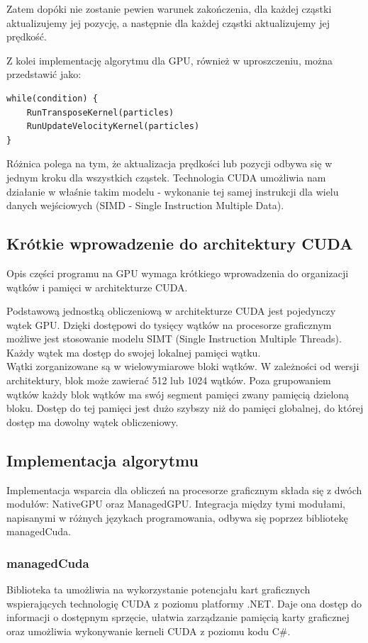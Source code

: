 \documentclass[12pt, twoside, openany, abstract=on]{report}
\theoremstyle{definition}
\begin{document}
Zatem dopóki nie zostanie pewien warunek zakończenia, dla każdej cząstki aktualizujemy jej pozycję, a następnie dla każdej cząstki aktualizujemy jej prędkość.

Z kolei implementację algorytmu dla GPU, również w uproszczeniu, można przedstawić jako:

\begin{lstlisting}[frame=single]
while(condition) {
	RunTransposeKernel(particles)
	RunUpdateVelocityKernel(particles)
}
\end{lstlisting}

Różnica polega na tym, że aktualizacja prędkości lub pozycji odbywa się w jednym kroku dla wszystkich cząstek. Technologia CUDA umożliwia nam działanie w właśnie takim modelu - wykonanie tej samej instrukcji dla wielu danych wejściowych (SIMD - Single Instruction Multiple Data).

\subsection{Krótkie wprowadzenie do architektury CUDA}
Opis części programu na GPU wymaga krótkiego wprowadzenia do organizacji wątków i pamięci w architekturze CUDA.

Podstawową jednostką obliczeniową 
w architekturze CUDA jest pojedynczy wątek GPU. Dzięki dostępowi do tysięcy wątków na procesorze graficznym możliwe jest stosowanie modelu SIMT (Single Instruction Multiple Threads). Każdy wątek ma dostęp do swojej lokalnej pamięci wątku. \\
Wątki zorganizowane są w wielowymiarowe bloki wątków. W zależności od wersji architektury, blok może zawierać 512 lub 1024 wątków. Poza grupowaniem wątków każdy blok wątków ma swój segment pamięci zwany pamięcią dzieloną bloku. Dostęp do tej pamięci jest dużo szybszy niż do pamięci globalnej, do której dostęp ma dowolny wątek obliczeniowy. \cite{CudaProgGuide}

\subsection{Implementacja algorytmu}
Implementacja wsparcia dla obliczeń na procesorze graficznym składa się z dwóch modułów: NativeGPU oraz ManagedGPU. Integracja między tymi modułami, napisanymi w różnych językach programowania, odbywa się poprzez bibliotekę managedCuda.

\subsubsection{managedCuda}
Biblioteka ta umożliwia na wykorzystanie potencjału kart graficznych wspierających technologię CUDA z poziomu platformy .NET. Daje ona dostęp do informacji o dostępnym sprzęcie, ułatwia zarządzanie pamięcią karty graficznej oraz umożliwia wykonywanie kerneli CUDA z poziomu kodu C\#. 
\end{document}
